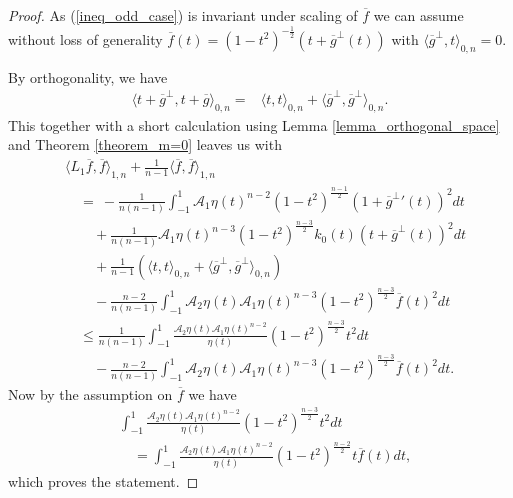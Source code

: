 \documentclass[12pt,twoside]{amsart}
\numberwithin{satz}{section}
\theoremstyle{definition}
\numberwithin{equation}{section}
\begin{document}
	\begin{proof}
		As (\ref{ineq_odd_case}) is invariant under scaling of $\overline{f}$ we can assume without loss of generality $\overline{f}(t)=(1-t^2)^{-\frac{1}{2}}\left(t+\overline{g}^\perp(t)\right)$ with $\langle \overline{g}^\perp,t\rangle_{0,n}=0$.
		
		By orthogonality, we have
		\begin{align*}
			\langle t+\overline{g}^\perp,t+\overline{g}\rangle_{0,n}=& \langle t,t\rangle_{0,n} + \langle \overline{g}^\perp,\overline{g}^\perp\rangle_{0,n}.
		\end{align*}
		This together with a short calculation using Lemma \ref{lemma_orthogonal_space} and Theorem \ref{theorem_m=0} leaves us with
		\begin{align*}
			& \langle L_1\overline{f},\overline{f}\rangle_{1,n} + \frac{1}{n-1}\langle \overline{f},\overline{f}\rangle_{1,n} \\ 
			& \quad = \ -\frac{1}{n(n-1)}\int_{-1}^1 \mathcal{A}_1\eta(t)^{n-2}(1-t^2)^{\frac{n-1}{2}}\left(1+{\overline{g}^\perp}'(t)\right)^2dt \\
			& \quad \quad + \frac{1}{n(n-1)}\mathcal{A}_1\eta(t)^{n-3}(1-t^2)^{\frac{n-3}{2}}k_0(t)\left(t+\overline{g}^\perp(t)\right)^2dt \\
			& \quad \quad + \frac{1}{n-1}\left(\langle t,t\rangle_{0,n} + \langle \overline{g}^\perp,\overline{g}^\perp\rangle_{0,n}\right) \\
			& \quad \quad -\frac{n-2}{n(n-1)} \int_{-1}^1 \mathcal{A}_2\eta(t)\mathcal{A}_1\eta(t)^{n-3} (1-t^2)^{\frac{n-3}{2}} \overline{f}(t)^2dt \\
			& \quad \leq \frac{1}{n(n-1)}\int_{-1}^1\frac{\mathcal{A}_2\eta(t)\mathcal{A}_1\eta(t)^{n-2}}{\eta(t)}(1-t^2)^{\frac{n-3}{2}}t^2dt \\
			& \quad \quad -\frac{n-2}{n(n-1)} \int_{-1}^1 \mathcal{A}_2\eta(t)\mathcal{A}_1\eta(t)^{n-3} (1-t^2)^{\frac{n-3}{2}} \overline{f}(t)^2dt. 
		\end{align*}
		Now by the assumption on $\overline{f}$ we have
		\begin{align*}
			&\int_{-1}^1\frac{\mathcal{A}_2\eta(t)\mathcal{A}_1\eta(t)^{n-2}}{\eta(t)}(1-t^2)^{\frac{n-3}{2}}t^2dt	\\
			& \quad = \int_{-1}^1\frac{\mathcal{A}_2\eta(t)\mathcal{A}_1\eta(t)^{n-2}}{\eta(t)}(1-t^2)^{\frac{n-2}{2}}t\overline{f}(t)dt,
		\end{align*}
		which proves the statement.
	\end{proof}
\end{document}
